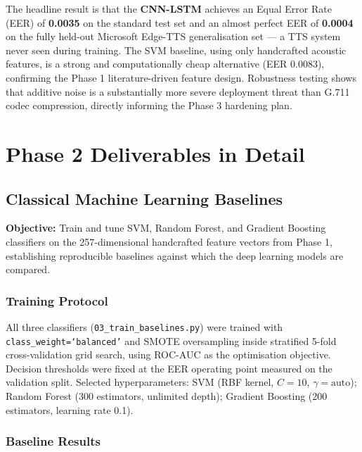 \documentclass[12pt,a4paper]{report}
\begin{document}
\medskip
The headline result is that the \textbf{CNN-LSTM} achieves an Equal Error Rate (EER) of
\textbf{0.0035} on the standard test set and an almost perfect EER of \textbf{0.0004} on the
fully held-out Microsoft Edge-TTS generalisation set --- a TTS system never seen during
training. The SVM baseline, using only handcrafted acoustic features, is a strong and
computationally cheap alternative (EER 0.0083), confirming the Phase 1 literature-driven
feature design. Robustness testing shows that additive noise is a substantially more severe
deployment threat than G.711 codec compression, directly informing the Phase 3 hardening
plan.

\chapter{Phase 2 Deliverables in Detail}

\section{Classical Machine Learning Baselines}

\textbf{Objective:} Train and tune SVM, Random Forest, and Gradient Boosting classifiers on
the 257-dimensional handcrafted feature vectors from Phase 1, establishing reproducible
baselines against which the deep learning models are compared.

\subsection{Training Protocol}

All three classifiers (\texttt{03\_train\_baselines.py}) were trained with
\texttt{class\_weight=`balanced'} and SMOTE oversampling inside stratified 5-fold
cross-validation grid search, using ROC-AUC as the optimisation objective. Decision
thresholds were fixed at the EER operating point measured on the validation split.
Selected hyperparameters: SVM (RBF kernel, $C=10$, $\gamma=\text{auto}$); Random Forest
(300 estimators, unlimited depth); Gradient Boosting (200 estimators, learning rate 0.1).

\subsection{Baseline Results}
\end{document}
